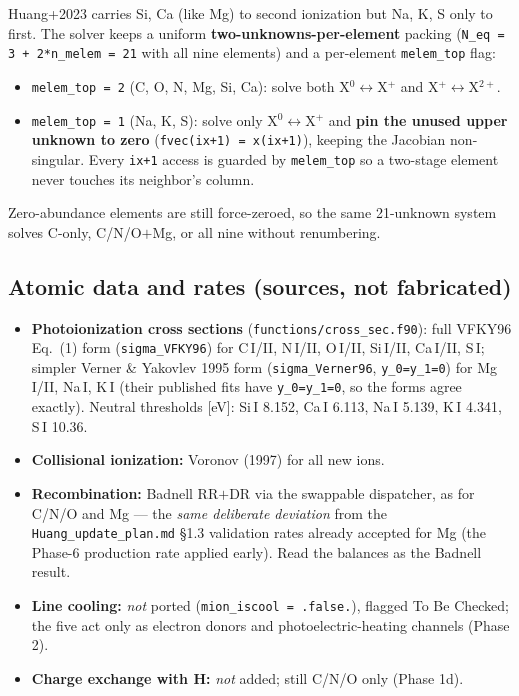 \documentclass[english,a4paper]{kiseon_memo}
\begin{document}
Huang+2023 carries Si, Ca (like Mg) to second ionization but Na, K, S only to
first. The solver keeps a uniform \textbf{two-unknowns-per-element} packing
(\verb|N_eq = 3 + 2*n_melem = 21| with all nine elements) and a per-element
\verb|melem_top| flag:
\begin{itemize}
\item \verb|melem_top = 2| (C, O, N, Mg, Si, Ca): solve both
  X$^0\!\leftrightarrow$X$^+$ and X$^+\!\leftrightarrow$X$^{2+}$.
\item \verb|melem_top = 1| (Na, K, S): solve only
  X$^0\!\leftrightarrow$X$^+$ and \textbf{pin the unused upper unknown to zero}
  (\verb|fvec(ix+1) = x(ix+1)|), keeping the Jacobian non-singular. Every
  \verb|ix+1| access is guarded by \verb|melem_top| so a two-stage element never
  touches its neighbor's column.
\end{itemize}
Zero-abundance elements are still force-zeroed, so the same 21-unknown system
solves C-only, C/N/O$+$Mg, or all nine without renumbering.

\subsection{Atomic data and rates (sources, not fabricated)}

{\sloppy
\begin{itemize}
\item \textbf{Photoionization cross sections} (\texttt{functions/cross\_sec.f90}):
  full VFKY96 Eq.~(1) form (\verb|sigma_VFKY96|) for C\,I/II, N\,I/II, O\,I/II,
  Si\,I/II, Ca\,I/II, S\,I; simpler Verner \& Yakovlev 1995 form
  (\verb|sigma_Verner96|, \verb|y_0=y_1=0|) for Mg\,I/II, Na\,I, K\,I (their
  published fits have \verb|y_0=y_1=0|, so the forms agree exactly). Neutral
  thresholds [eV]: Si\,I 8.152, Ca\,I 6.113, Na\,I 5.139, K\,I 4.341, S\,I 10.36.
\item \textbf{Collisional ionization:} Voronov (1997) for all new ions.
\item \textbf{Recombination:} Badnell RR$+$DR via the swappable dispatcher, as
  for C/N/O and Mg --- the \emph{same deliberate deviation} from the
  \texttt{Huang\_update\_plan.md} \S1.3 validation rates already accepted for Mg
  (the Phase-6 production rate applied early). Read the balances as the Badnell
  result.
\item \textbf{Line cooling:} \emph{not} ported (\verb|mion_iscool = .false.|),
  flagged To Be Checked; the five act only as electron donors and
  photoelectric-heating channels (Phase 2).
\item \textbf{Charge exchange with H:} \emph{not} added; still C/N/O only
  (Phase 1d).
\end{itemize}
}
\end{document}
